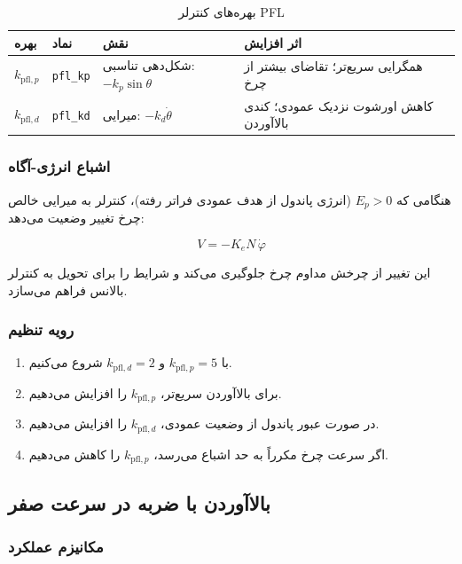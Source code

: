 \begin{table}[H]
\centering
\caption{بهره‌های کنترلر PFL}
\label{tab:pfl-gains}
\begin{tabular}{@{}llll@{}}
\toprule
بهره & نماد & نقش & اثر افزایش \\
\midrule
$k_{\text{pfl},p}$ & \texttt{pfl\_kp} & شکل‌دهی تناسبی: $-k_p\sin\theta$ & همگرایی سریع‌تر؛ تقاضای بیشتر از چرخ \\
$k_{\text{pfl},d}$ & \texttt{pfl\_kd} & میرایی: $-k_d\dot\theta$ & کاهش اورشوت نزدیک عمودی؛ کندی بالاآوردن \\
\bottomrule
\end{tabular}
\end{table}

\subsubsection{اشباع انرژی-آگاه}

هنگامی که $E_p > 0$ (انرژی پاندول از هدف عمودی فراتر رفته)، کنترلر به میرایی خالص چرخ تغییر وضعیت می‌دهد:

\begin{equation}
V = -K_e N\,\dot\varphi
\end{equation}

این تغییر از چرخش مداوم چرخ جلوگیری می‌کند و شرایط را برای تحویل به کنترلر بالانس فراهم می‌سازد.

\subsubsection{رویه تنظیم}

\begin{enumerate}[label=\arabic*.]
    \item با $k_{\text{pfl},p} = 5$ و $k_{\text{pfl},d} = 2$ شروع می‌کنیم.
    \item برای بالاآوردن سریع‌تر، $k_{\text{pfl},p}$ را افزایش می‌دهیم.
    \item در صورت عبور پاندول از وضعیت عمودی، $k_{\text{pfl},d}$ را افزایش می‌دهیم.
    \item اگر سرعت چرخ مکرراً به حد اشباع می‌رسد، $k_{\text{pfl},p}$ را کاهش می‌دهیم.
\end{enumerate}


\subsection{بالاآوردن با ضربه در سرعت صفر}

\subsubsection{مکانیزم عملکرد}

